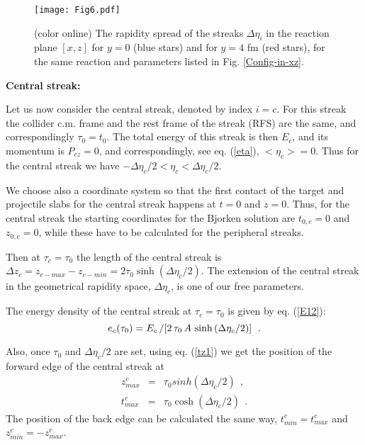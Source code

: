 \documentclass[aps,prc,twocolumn,floatfix,showpacs,a4paper,
nofootinbib,amsmath,amssymb]{revtex4-1}
\newcommand{\be}{\begin{equation}}
\newcommand{\ee}{\end{equation}}
\newcommand{\ba}{\begin{eqnarray}}
\newcommand{\ea}{\end{eqnarray}}
\begin{document}
%
\begin{figure}[htb]     %
\begin{center}
\resizebox{1.01\columnwidth}{!}
{\texttt{[image: Fig6.pdf]}}  
\caption{ (color online)
The rapidity spread of the streaks $\Delta\eta_i$ in the reaction 
plane $[x,z]$ for $y=0$
(blue stars) and for $y=4$ fm (red stars),
for the same reaction and parameters listed in Fig. \ref{Config-in-xz}.
}
\label{Delta-eta}
\end{center}
\end{figure}        %
%

{\bf Central streak:}  %

Let us  now consider the central streak, denoted by index $i = c$.
For this streak the collider c.m. frame and the rest frame
of the streak (RFS) are the same, and correspondingly $\tau_0 = t_0$.
The total energy of this streak is then $E_c$, 
and its momentum  is $P_{cz}=0$, and correspondingly, see eq. (\ref{eta}),  $<\eta_c>=0$.
Thus for the central streak we have $-\Delta \eta_c /2 <\eta_c < \Delta \eta_c /2$.

We choose also a coordinate system so that the first contact of the target and projectile slabs for the central streak happens at $t=0$ and $z=0$. Thus, for the central streak 
the starting coordinates for the Bjorken solution are $t_{0,c} = 0$ and $z_{0,c} = 0$, while these have to be calculated for the peripheral streaks. 


Then at $\tau_c=\tau_0$ the length of the central streak 
is $\Delta z_c = z_{c-max} - z_{c-min}= 2 \tau_0 \sinh \left(\Delta \eta_{c} /2\right)$.  
The extension of the central streak  in the geometrical rapidity space, $\Delta \eta_{c}$, is one of our free parameters.

The energy density of the central streak at $\tau_c=\tau_0$ is given by eq. (\ref{E12}):
\be
e_c(\tau_0) =
E_c \left/\left[ 2\, \tau_0\, A\, \sinh \left(
\Delta\eta_c/2\right) \right] \right. \ .
\label{EC}
\ee

Also, once $\tau_0$ and $\Delta \eta_c/2$ are set, using
eq. (\ref{tz1}) we get the position of the forward edge of the
central streak at 
\ba
z_{max}^{c} &=& \tau_0 sinh(\Delta \eta_c /2) \ \ ,
\nonumber \\
t_{max}^{c} &=& \tau_0 \cosh (\Delta\eta_c /2 ) \ \ .
\label{ztcm}
\ea
The position of the back edge can be calculated the same way,
$t_{min}^{c}=t_{max}^{c}$ and $z_{min}^{c}=-z_{max}^{c}$.
\smallskip
\end{document}
